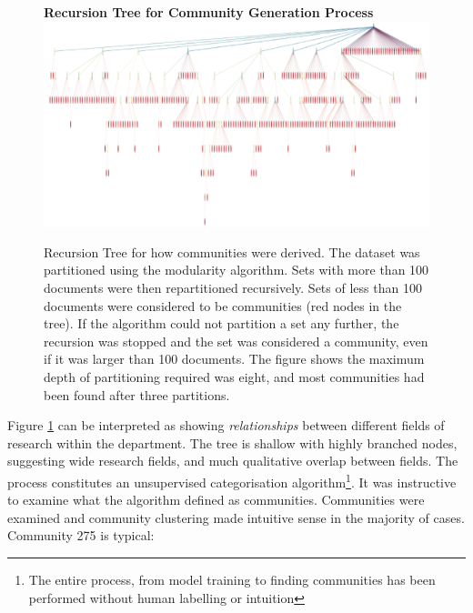 \begin{center}
\begin{figure}[H]
  \centering
  \textbf{Recursion Tree for Community Generation Process}
    \includegraphics[width=\textwidth]{Analysis/comms.png}
    \caption[Recursion Tree for Document Community Generation]{Recursion Tree for how communities were derived. The dataset was partitioned using the modularity algorithm. Sets with more than 100 documents were then repartitioned recursively. Sets of less than 100 documents were considered to be communities (red nodes in the tree). If the algorithm could not partition a set any further, the recursion was stopped and the set was considered a community, even if it was larger than 100 documents.  The figure shows the maximum depth of partitioning required was eight, and most communities had been found after three partitions.}
    \label{fig:COMMTREE}
\end{figure} 
\end{center}
Figure \ref{fig:COMMTREE} can be interpreted as showing \emph{relationships} between different fields of research within the department. The tree is shallow with highly branched nodes, suggesting wide research fields, and much qualitative overlap between fields.
The process constitutes an unsupervised categorisation algorithm\footnote{The entire process, from model training to finding communities has been performed without human labelling or intuition}. It was instructive to examine what the algorithm defined as communities.
Communities were examined and community clustering made intuitive sense in the majority of cases. Community 275 is typical:
